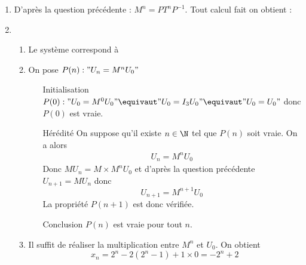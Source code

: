 \documentclass[a4paper, 11pt,reqno]{article}
\begin{document}
\begin{correction}
\begin{enumerate}
\begin{itemize}
\end{itemize}
\item 
D'après la question précédente : 
$M^n = PT^n P^{-1}$. Tout calcul fait on obtient : 

\item \begin{enumerate}
\item Le système correspond à 

\item
On pose $P(n) : "U_n = M^n U_0"$
\begin{itemize}
\item[Initialisation] 
$P(0):  "U_0 = M^0 U_0" \equivaut  "U_0 = I_3 U_0" \equivaut  "U_0 =  U_0"$
donc $P(0)$ est vraie. 

\item[Hérédité] On suppose qu'il existe $n\in \N$ tel que $P(n)$ soit vraie. 
On a alors 
\begin{align*}
U_n=M^n U_0
\end{align*}
Donc $MU_n= M \times M^{n}U_0$ et d'après la question précédente $U_{n+1} =MU_n$ donc 
$$U_{n+1} =M^{n+1} U_0$$
La propriété $P(n+1)$ est donc vérifiée. 
\item[Conclusion] $P(n)$ est vraie pour tout $n$. 




\end{itemize}
\item Il suffit de réaliser la multiplication entre $M^n $ et $U_0$. On obtient 
$$x_n = 2^n -2(2^n-1) +1\times 0 = -2^n+2$$

\end{enumerate}




\end{enumerate}
\end{correction}
\end{document}
